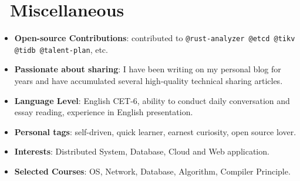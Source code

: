 \documentclass{resume}
\newcommand{\en}[1]{#1}
\newcommand{\zh}[1]{}
\begin{document}
\section{\faInfo\ \en{Miscellaneous}\zh{杂项}}
\begin{itemize}[parsep=0.25ex]
      \item \en{\textbf{Open-source Contributions}: contributed to \texttt{@rust-analyzer @etcd @tikv @tidb @talent-plan}, etc.}
            \zh{\textbf{开源贡献}: 为 \texttt{@rust-analyzer @etcd @tikv @tidb @talent-plan} 等项目组织贡献过代码}
      \item \en{\textbf{Passionate about sharing}: I have been writing on my personal blog for years and have accumulated several high-quality technical sharing articles.}
            \zh{\textbf{热爱分享}: 在个人博客上常年坚持写作，积累高质量技术分享文章数篇}
      \item \en{\textbf{Language Level}: English CET-6, ability to conduct daily conversation and essay reading, experience in English presentation.}
            \zh{\textbf{语言水平}：英语 CET-6，能够进行日常对话和论文阅读，有英文演讲经验}
      \item \en{\textbf{Personal tags}: self-driven, quick learner, earnest curiosity, open source lover.}
            \zh{\textbf{个人标签}：自驱动，学习能力强，做事认真，保持好奇，热爱开源}
      \item \en{\textbf{Interests}: Distributed System, Database, Cloud and Web application.}
            \zh{\textbf{兴趣领域}：分布式系统、数据库、云以及 Web 应用等}
      \item \en{\textbf{Selected Courses}: OS, Network, Database, Algorithm, Compiler Principle.}
            \zh{\textbf{主修课程}：操作系统、计算机网络、数据库系统原理、算法设计与分析、编译原理}
\end{itemize}
\end{document}
